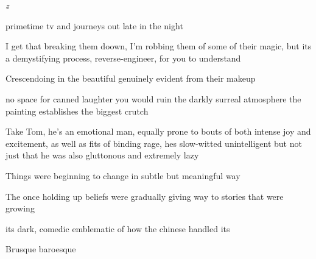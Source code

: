 



\lettrine{\textit{z}}{} \\

primetime tv
and journeys out late in the night

I get that breaking them doown, I'm robbing them  of some of their magic, but its a demystifying process, reverse-engineer, for you to understand

Crescendoing in the beautiful
genuinely evident from their makeup

no space for canned laughter
you would ruin the darkly surreal atmosphere the painting establishes
the biggest crutch

Take Tom, he's an emotional man, equally prone to bouts of both intense joy and excitement, as well as fits of binding rage, hes slow-witted unintelligent but not just that he was also gluttonous and extremely lazy

Things were beginning to change in subtle but meaningful way

The once holding up beliefs were gradually giving way to stories that were growing

its dark, comedic emblematic of how the chinese handled its

Brusque
baroesque

